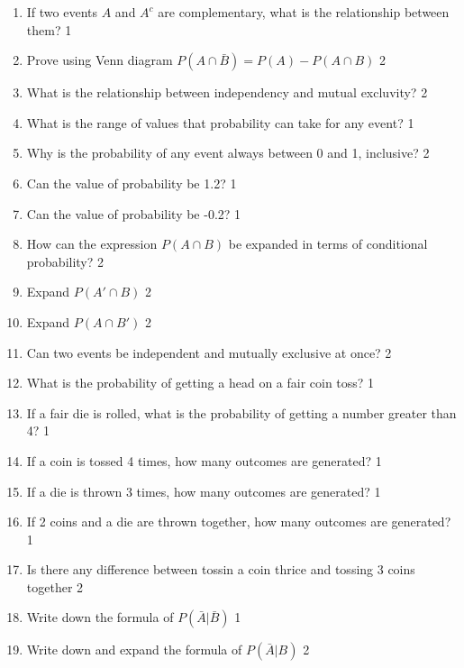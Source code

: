 \documentclass[a4paper,oneside, margin=1.4in]{book}
\begin{document}
\begin{enumerate}
\item If two events \( A \) and \( A^c \) are complementary, what is the relationship between them? \hfill 1

\item Prove using Venn diagram $P(A\cap \bar B) = P(A) - P(A\cap B)$ \hfill 2

 \item 	What is the relationship between independency and mutual excluvity? \hfill 2

\item What is the range of values that probability can take for any event? \hfill 1

\item Why is the probability of any event always between 0 and 1, inclusive? \hfill 2

\item Can the value of probability be 1.2? \hfill 1

\item Can the value of probability be -0.2? \hfill 1

\item How can the expression \( P(A \cap B) \) be expanded in terms of conditional probability? \hfill 2

\item Expand \( P(A' \cap B) \) \hfill 2

\item Expand \( P(A \cap B') \) \hfill 2

\item Can two events be independent and mutually exclusive at once? \hfill 2

\item What is the probability of getting a head on a fair coin toss? \hfill 1

\item If a fair die is rolled, what is the probability of getting a number greater than 4? \hfill 1

\item If a coin is tossed 4 times, how many outcomes are generated? \hfill 1

\item If a die is thrown 3 times, how many outcomes are generated? \hfill 1

\item If 2 coins and a die are thrown together, how many outcomes are generated? \hfill 1

\item Is there any difference between tossin a coin thrice and tossing 3 coins together \hfill 2

\item Write down the formula of $P(\bar A | \bar B)$ \hfill 1

\item Write down and expand the formula of $P(\bar A | B)$ \hfill 2


  \end{enumerate}
\end{document}
